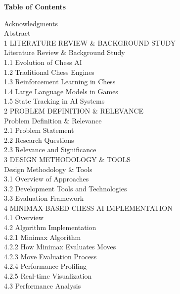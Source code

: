 \documentclass[11pt,a4paper]{report}
\begin{document}
\clearpage
\pagestyle{fancy}
\thispagestyle{fancy}
\begin{center}
    \vspace*{1cm}
    {\LARGE\bfseries Table of Contents}
\end{center}
\vspace{1cm}
\noindent
Acknowledgments \\
Abstract \\
1 LITERATURE REVIEW \& BACKGROUND STUDY \\
Literature Review \& Background Study \\
1.1 Evolution of Chess AI \\
1.2 Traditional Chess Engines \\
1.3 Reinforcement Learning in Chess \\
1.4 Large Language Models in Games \\
1.5 State Tracking in AI Systems \\
2 PROBLEM DEFINITION \& RELEVANCE \\
Problem Definition \& Relevance \\
2.1 Problem Statement \\
2.2 Research Questions \\
2.3 Relevance and Significance \\
3 DESIGN METHODOLOGY \& TOOLS \\
Design Methodology \& Tools \\
3.1 Overview of Approaches \\
3.2 Development Tools and Technologies \\
3.3 Evaluation Framework \\
4 MINIMAX-BASED CHESS AI IMPLEMENTATION \\
4.1 Overview \\
4.2 Algorithm Implementation \\
4.2.1 Minimax Algorithm \\
4.2.2 How Minimax Evaluates Moves \\
4.2.3 Move Evaluation Process \\
4.2.4 Performance Profiling \\
4.2.5 Real-time Visualization \\
4.3 Performance Analysis \\
\end{document}

